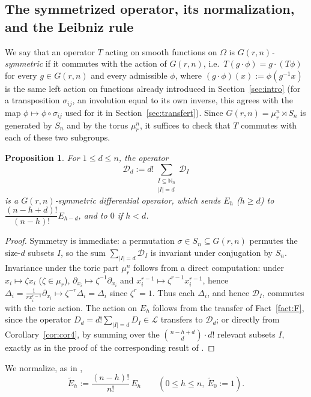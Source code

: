 \documentclass[10pt,a4paper]{amsart}
\newtheorem{proposition}[theorem]{Proposition}
\newcommand{\NN}{\mathbb{N}}
\begin{document}
\subsection{The symmetrized operator, its normalization, and the Leibniz rule}

We say that an operator $T$ acting on smooth functions on $\Omega$ is \emph{$G(r,n)$-symmetric} if it commutes with the action of $G(r,n)$, i.e.\ $T(g\cdot\phi)=g\cdot(T\phi)$ for every $g\in G(r,n)$ and every admissible $\phi$, where $(g\cdot\phi)(x):=\phi(g^{-1}x)$ is the same left action on functions already introduced in Section~\ref{sec:intro} (for a transposition $\sigma_{ij}$, an involution equal to its own inverse, this agrees with the map $\phi\mapsto\phi\circ\sigma_{ij}$ used for it in Section~\ref{sec:transfert}). Since $G(r,n)=\mu_r^n\rtimes S_n$ is generated by $S_n$ and by the torus $\mu_r^n$, it suffices to check that $T$ commutes with each of these two subgroups.

\begin{proposition}\label{prop:prop6}
For $1\le d\le n$, the operator
\[
\mathcal D_d := d!\sum_{\substack{I\subseteq\NN_n\\ |I|=d}} \mathcal D_I
\]
is a $G(r,n)$-symmetric differential operator, which sends $E_h$ ($h\ge d$) to $\dfrac{(n-h+d)!}{(n-h)!}E_{h-d}$, and to $0$ if $h<d$.
\end{proposition}

\begin{proof}
Symmetry is immediate: a permutation $\sigma\in S_n\subseteq G(r,n)$ permutes the size-$d$ subsets $I$, so the sum $\sum_{|I|=d}\mathcal D_I$ is invariant under conjugation by $S_n$. Invariance under the toric part $\mu_r^n$ follows from a direct computation: under $x_i\mapsto\zeta x_i$ ($\zeta\in\mu_r$), $\partial_{x_i}\mapsto\zeta^{-1}\partial_{x_i}$ and $x_i^{r-1}\mapsto\zeta^{r-1}x_i^{r-1}$, hence $\Delta_i=\frac{1}{rx_i^{r-1}}\partial_{x_i}\mapsto \zeta^{-r}\Delta_i=\Delta_i$ since $\zeta^r=1$. Thus each $\Delta_i$, and hence $\mathcal D_I$, commutes with the toric action. The action on $E_h$ follows from the transfer of Fact~\ref{fact:F}, since the operator $D_d=d!\sum_{|I|=d}D_I\in\mathcal L$ transfers to $\mathcal D_d$; or directly from Corollary~\ref{cor:cor4}, by summing over the $\binom{n-h+d}{d}\cdot d!$ relevant subsets $I$, exactly as in the proof of the corresponding result of \cite{Ze}.
\end{proof}

We normalize, as in \cite{Ze},
\[
\widetilde E_h := \frac{(n-h)!}{n!}\,E_h \qquad (0\le h\le n,\ \widetilde E_0:=1).
\]
\end{document}
